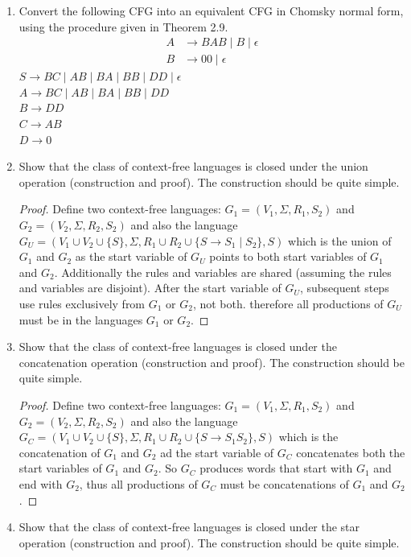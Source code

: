 \documentclass{article}
\begin{document}
\begin{enumerate}
        \item Convert the following CFG into an equivalent CFG in Chomsky normal form, using the procedure given in Theorem 2.9.
            \begin{align*}
                A&\rightarrow BAB\mid B\mid \epsilon\\
                B&\rightarrow 00 \mid \epsilon
            \end{align*}
            $S\rightarrow BC \mid AB \mid BA \mid BB \mid DD \mid \epsilon$\\
            $A\rightarrow BC\mid AB \mid BA \mid BB \mid DD$\\
            $B\rightarrow DD$\\
            $C\rightarrow AB$\\
            $D\rightarrow 0$
        \item Show that the class of context-free languages is closed under the union operation (construction and proof). The construction should be quite simple.
            \begin{proof}
                Define two context-free languages: $G_1=(V_1, \Sigma, R_1, S_2)$ and $G_2=(V_2, \Sigma, R_2, S_2)$ and also the language $G_U = (V_1\cup V_2\cup \{S\},\Sigma, R_1\cup R_2\cup \{S\rightarrow S_1 \mid S_2\}, S )$ which is the union of $G_1$ and $G_2$ as the start variable of $G_U$ points to both start variables of $G_1$ and $G_2$. Additionally the rules and variables are shared (assuming the rules and variables are disjoint). After the start variable of $G_U$, subsequent steps use rules exclusively from $G_1$ or $G_2$, not both. therefore all productions of $G_U$ must be in the languages $G_1$ or $G_2$.
            \end{proof}
        \item Show that the class of context-free languages is closed under the concatenation operation (construction and proof). The construction should be quite simple.
            \begin{proof}
                Define two context-free languages: $G_1=(V_1, \Sigma, R_1, S_2)$ and $G_2=(V_2, \Sigma, R_2, S_2)$ and also the language $G_C=(V_1\cup V_2\cup \{S\}, \Sigma, R_1\cup R_2\cup \{S\rightarrow S_1S_2\}, S)$ which is the concatenation of $G_1$ and $G_2$ ad the start variable of $G_C$ concatenates both the start variables of $G_1$ and $G_2$. So $G_C$ produces words that start with $G_1$ and end with $G_2$, thus all productions of $G_C$ must be concatenations of $G_1$ and $G_2$.
            \end{proof}
        \item Show that the class of context-free languages is closed under the star operation (construction and proof). The construction should be quite simple.


\end{enumerate}
\end{document}
